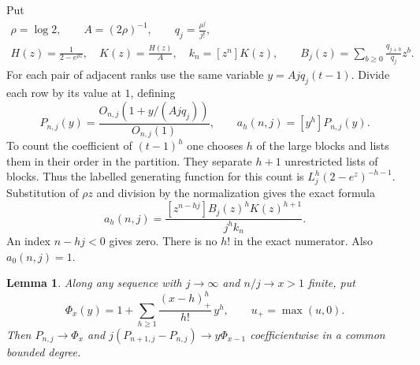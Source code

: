 \documentclass[11pt]{article}
\newtheorem{lemma}[theorem]{Lemma}
\begin{document}
Put
\[
 \begin{gathered}
 \rho=\log 2,\qquad A=(2\rho)^{-1},\qquad q_j=\frac{\rho^j}{j!},\\
 H(z)=\frac{1}{2-e^{\rho z}},\quad K(z)=\frac{H(z)}A,\quad
 k_n=[z^n]K(z),\qquad B_j(z)=\sum_{b\ge0}\frac{q_{j+b}}{q_j}z^b .
 \end{gathered}
\]
For each pair of adjacent ranks use the same variable \(y=Ajq_j(t-1)\). Divide each row by its value at \(1\), defining
\[
 P_{n,j}(y)=\frac{O_{n,j}(1+y/(Ajq_j))}{O_{n,j}(1)},\qquad
 a_h(n,j)=[y^h]P_{n,j}(y).
\]
To count the coefficient of \((t-1)^h\) one chooses \(h\) of the large blocks and lists them in their order in the partition. They separate \(h+1\) unrestricted lists of blocks. Thus the labelled generating function for this count is \(L_j^h(2-e^z)^{-h-1}\). Substitution of \(\rho z\) and division by the normalization gives the exact formula
\begin{equation}\label{eq:coeff}
 a_h(n,j)=\frac{[z^{n-hj}]B_j(z)^h K(z)^{h+1}}{j^h k_n} .
\end{equation}
An index \(n-hj<0\) gives zero. There is no \(h!\) in the exact numerator. Also \(a_0(n,j)=1\).

\begin{lemma}\label{lem:limit}
Along any sequence with \(j\to\infty\) and \(n/j\to x>1\) finite, put
\[
 \Phi_x(y)=1+\sum_{h\ge1}\frac{(x-h)_+^h}{h!}\,y^h,\qquad
 u_+=\max(u,0).
\]
Then \(P_{n,j}\to\Phi_x\) and \(j(P_{n+1,j}-P_{n,j})\to y\Phi_{x-1}\) coefficientwise in a common bounded degree.
\end{lemma}
\end{document}
